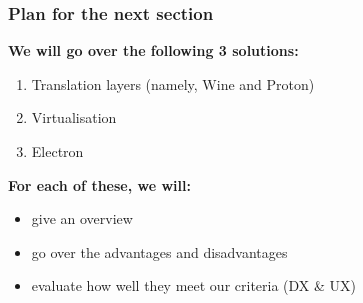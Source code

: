 \begin{frame}
\frametitle{Plan for the next section}

\begin{exbox}
\textbf{We will go over the following 3 solutions:}
\vspace{5pt}
\begin{enumerate}
    \item Translation layers (namely, Wine and Proton)
    \item Virtualisation
    \item Electron
\end{enumerate}
\end{exbox}

\begin{exbox}
\textbf{For each of these, we will:}
\vspace{5pt}
\begin{itemize}
    \item give an overview
    \item go over the advantages and disadvantages
    \item evaluate how well they meet our criteria (DX \& UX)
\end{itemize}    
\end{exbox}

\end{frame}